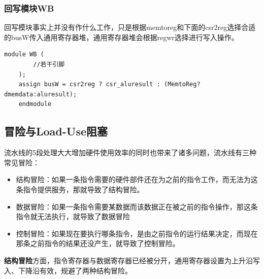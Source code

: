 \documentclass[]{article}
\begin{document}
  \subsubsection{回写模块WB}

  回写模块事实上并没有作什么工作，只是根据memtoreg和下面的csr2reg选择合适的busW传入通用寄存器堆，通用寄存器堆会根据regwr选择进行写入操作。

  \begin{lstlisting}[style={verilog-style}]
    module WB (
        //若干引脚
    );
    assign busW = csr2reg ? csr_aluresult : (MemtoReg?dmemdata:aluresult);
    endmodule
  \end{lstlisting}    
  \subsection{冒险与Load-Use阻塞}
  流水线的5段处理大大增加硬件使用效率的同时也带来了诸多问题，流水线有三种常见冒险：
  \begin{itemize}
      \item 结构冒险：如果一条指令需要的硬件部件还在为之前的指令工作，而无法为这条指令提供服务，那就导致了结构冒险。
      \item 数据冒险：如果一条指令需要某数据而该数据正在被之前的指令操作，那这条指令就无法执行，就导致了数据冒险
      \item 控制冒险：如果现在要执行哪条指令，是由之前指令的运行结果决定，而现在那条之前指令的结果还没产生，就导致了控制冒险。
  \end{itemize}
  
  \textbf{结构冒险}方面，指令寄存器与数据寄存器已经被分开，通用寄存器设置为上升沿写入、下降沿有效，规避了两种结构冒险。
  
\end{document}
